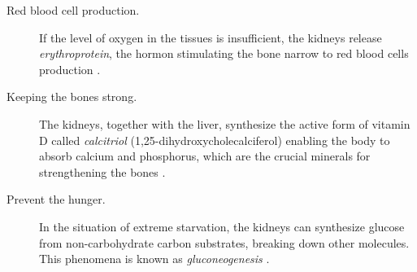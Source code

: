 \begin{description}
	\item [Red blood cell production.] If the level of oxygen in the tissues is insufficient, the kidneys release \textit{erythroprotein}, the hormon stimulating the bone narrow to red blood cells production \cite{donnelly2001erythropoietin}. 

\item [Keeping the bones strong.] The kidneys, together with the liver, synthesize the active form of vitamin D called \textit{calcitriol} (1,25-dihydroxycholecalciferol) enabling the body to absorb calcium and phosphorus, which are the crucial minerals for strengthening the bones \cite{williams2009vitamin}.

\item [Prevent the hunger.] In the situation of extreme starvation, the kidneys can synthesize glucose from non-carbohydrate carbon substrates, breaking down other molecules. This phenomena is known as \textit{gluconeogenesis} \cite{newsholme1967control}.
%					
	\end{description} 

